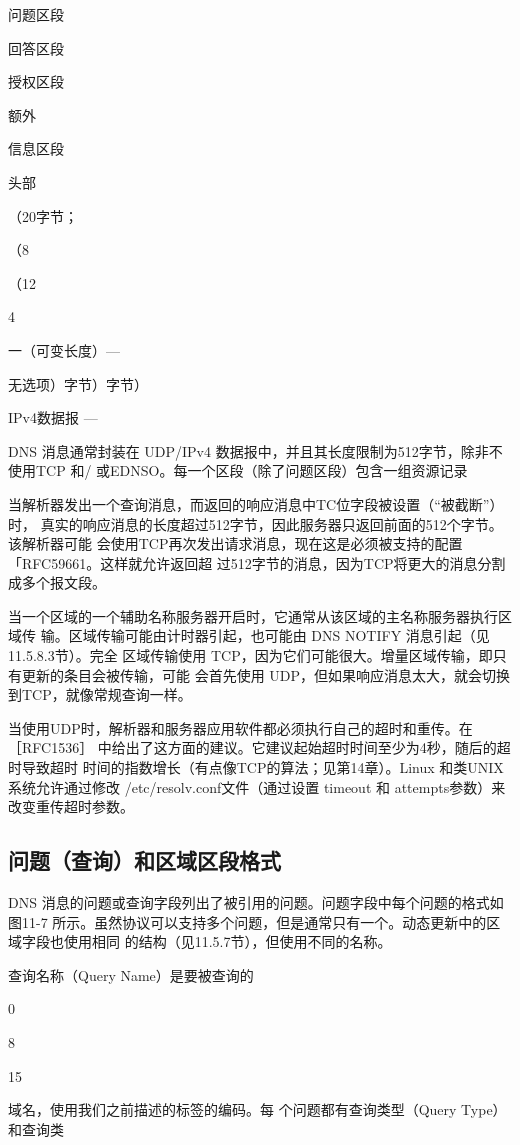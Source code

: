 问题区段

回答区段

授权区段

额外

信息区段

头部

（20字节；

（8

（12

4

一（可变长度）—

无选项）字节）字节）

IPv4数据报 —

DNS 消息通常封装在 UDP/IPv4 数据报中，并且其长度限制为512字节，除非不使用TCP 和/
或EDNSO。每一个区段（除了问题区段）包含一组资源记录

当解析器发出一个查询消息，而返回的响应消息中TC位字段被设置（“被截断”）时，
真实的响应消息的长度超过512字节，因此服务器只返回前面的512个字节。该解析器可能
会使用TCP再次发出请求消息，现在这是必须被支持的配置「RFC59661。这样就允许返回超
过512字节的消息，因为TCP将更大的消息分割成多个报文段。

当一个区域的一个辅助名称服务器开启时，它通常从该区域的主名称服务器执行区域传
输。区域传输可能由计时器引起，也可能由 DNS NOTIFY 消息引起（见11.5.8.3节）。完全
区域传输使用 TCP，因为它们可能很大。增量区域传输，即只有更新的条目会被传输，可能
会首先使用 UDP，但如果响应消息太大，就会切换到TCP，就像常规查询一样。

当使用UDP时，解析器和服务器应用软件都必须执行自己的超时和重传。在
［RFC1536］ 中给出了这方面的建议。它建议起始超时时间至少为4秒，随后的超时导致超时
时间的指数增长（有点像TCP的算法；见第14章）。Linux 和类UNIX系统允许通过修改
/etc/resolv.conf文件（通过设置 timeout 和 attempts参数）来改变重传超时参数。

\subsection{问题（查询）和区域区段格式}

DNS 消息的问题或查询字段列出了被引用的问题。问题字段中每个问题的格式如图11-7
所示。虽然协议可以支持多个问题，但是通常只有一个。动态更新中的区域字段也使用相同
的结构（见11.5.7节），但使用不同的名称。

查询名称（Query Name）是要被查询的

0

8

15

域名，使用我们之前描述的标签的编码。每
个问题都有查询类型（Query Type） 和查询类

